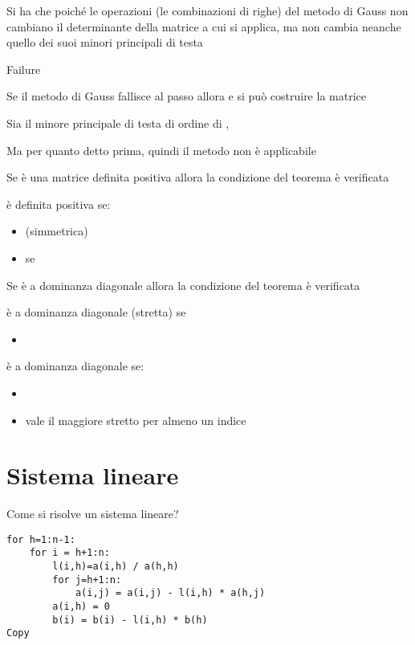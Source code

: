 \documentclass[
]{article}
\providecommand{\tightlist}{%
  \setlength{\itemsep}{0pt}\setlength{\parskip}{0pt}}
\begin{document}
Si ha che {} poiché le operazioni (le combinazioni di righe) del metodo
di Gauss non cambiano il determinante della matrice a cui si applica, ma
non cambia neanche quello dei suoi minori principali di testa

Failure

Se il metodo di Gauss fallisce al passo {} allora {} e si può costruire
la matrice

Sia {} il minore principale di testa di ordine {} di {}, {}

Ma {} per quanto detto prima, quindi il metodo non è applicabile

Se {} è una matrice definita positiva allora la condizione del teorema è
verificata

{} è definita positiva se:

\begin{itemize}
\tightlist
\item
  {} (simmetrica)
\item
  {} se {}
\end{itemize}

Se {} è a dominanza diagonale allora la condizione del teorema è
verificata

{} è a dominanza diagonale (stretta) se

\begin{itemize}
\tightlist
\item
  {}
\end{itemize}

{} è a dominanza diagonale se:

\begin{itemize}
\tightlist
\item
  {}
\item
  vale il maggiore stretto per almeno un indice
\end{itemize}

\hypertarget{sistema-lineare}{%
\section{Sistema lineare}\label{sistema-lineare}}

Come si risolve un sistema lineare?\\
{}{}

\begin{verbatim}
for h=1:n-1:
    for i = h+1:n:
        l(i,h)=a(i,h) / a(h,h)
        for j=h+1:n:
            a(i,j) = a(i,j) - l(i,h) * a(h,j)
        a(i,h) = 0
        b(i) = b(i) - l(i,h) * b(h)
Copy
\end{verbatim}
\end{document}

